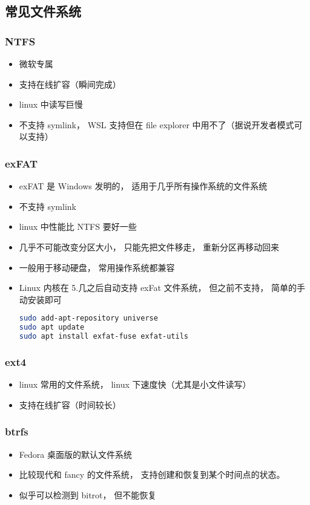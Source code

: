 \subsection{常见文件系统}
\subsubsection{NTFS}
\begin{itemize}
\item 微软专属
\item 支持在线扩容（瞬间完成）
\item linux 中读写巨慢
\item 不支持 symlink， WSL 支持但在 file explorer 中用不了（据说开发者模式可以支持）
\end{itemize}

\subsubsection{exFAT}
\begin{itemize}
\item exFAT 是 Windows 发明的， 适用于几乎所有操作系统的文件系统
\item 不支持 symlink
\item linux 中性能比 NTFS 要好一些
\item 几乎不可能改变分区大小， 只能先把文件移走， 重新分区再移动回来
\item 一般用于移动硬盘， 常用操作系统都兼容
\item Linux 内核在 5.几之后自动支持 exFat 文件系统， 但之前不支持， 简单的手动安装即可
\begin{lstlisting}[language=bash]
sudo add-apt-repository universe
sudo apt update
sudo apt install exfat-fuse exfat-utils
\end{lstlisting}
\end{itemize}

\subsubsection{ext4}
\begin{itemize}
\item linux 常用的文件系统， linux 下速度快（尤其是小文件读写）
\item 支持在线扩容（时间较长）
\end{itemize}

\subsubsection{btrfs}
\begin{itemize}
\item Fedora 桌面版的默认文件系统
\item 比较现代和 fancy 的文件系统， 支持创建和恢复到某个时间点的状态。
\item 似乎可以检测到 bitrot， 但不能恢复
\end{itemize}

